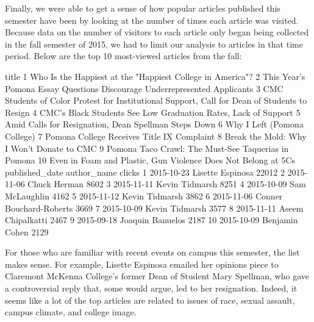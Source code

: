 \documentclass[a4paper]{article}
\begin{document}
Finally, we were able to get a sense of how popular articles published this semester have been by looking at the number of times each article was visited. Because data on the number of visitors to each article only began being collected in the fall semester of 2015, we had to limit our analysis to articles in that time period. Below are the top 10 most-viewed articles from the fall:

\begin{Schunk}
\begin{Soutput}
                                                                                          title
1                                     Who Is the Happiest at the "Happiest College in America"?
2                     This Year's Pomona Essay Questions Discourage Underrepresented Applicants
3  CMC Students of Color Protest for Institutional Support, Call for Dean of Students to Resign
4                                CMC’s Black Students See Low Graduation Rates, Lack of Support
5                                          Amid Calls for Resignation, Dean Spellman Steps Down
6                                                                   Why I Left (Pomona College)
7                                                    Pomona College Receives Title IX Complaint
8                                                     Break the Mold: Why I Won’t Donate to CMC
9                                           Pomona Taco Crawl: The Must-See Taquerias in Pomona
10                               Even in Foam and Plastic, Gun  Violence Does Not Belong at 5Cs
   published_date             author_name clicks
1      2015-10-23        Lisette Espinosa  22012
2      2015-11-06            Chuck Herman   8602
3      2015-11-11          Kevin Tidmarsh   8251
4      2015-10-09          Sam McLaughlin   4162
5      2015-11-12          Kevin Tidmarsh   3862
6      2015-11-06 Conner Bouchard-Roberts   3669
7      2015-10-09          Kevin Tidmarsh   3577
8      2015-11-11       Aseem Chipalkatti   2467
9      2015-09-18        Joaquin Banuelos   2187
10     2015-10-09          Benjamin Cohen   2129
\end{Soutput}
\end{Schunk}


For those who are familiar with recent events on campus this semester, the list makes sense. For example, Lisette Espinosa emailed her opinions piece to Claremont McKenna College's former Dean of Student Mary Spellman, who gave a controversial reply that, some would argue, led to her resignation. Indeed, it seems like a lot of the top articles are related to issues of race, sexual assault, campus climate, and college image. 
\end{document}
